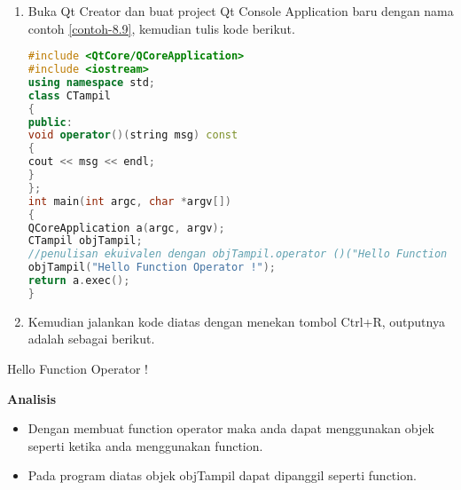\begin{enumerate}

\item
  Buka Qt Creator dan buat project Qt Console Application baru dengan
  nama contoh \ref{contoh-8.9}, kemudian tulis kode berikut.

\begin{lstlisting}[language=c++, caption=Menggunakan operator() untuk membuat function object., label=contoh-8.9]
#include <QtCore/QCoreApplication>
#include <iostream>
using namespace std;
class CTampil
{
public:
void operator()(string msg) const
{
cout << msg << endl;
}
};
int main(int argc, char *argv[])
{
QCoreApplication a(argc, argv);
CTampil objTampil;
//penulisan ekuivalen dengan objTampil.operator ()("Hello Function Operator !");
objTampil("Hello Function Operator !");
return a.exec();
}
\end{lstlisting}
\item
  Kemudian jalankan kode diatas dengan menekan tombol Ctrl+R, outputnya
  adalah sebagai berikut.
\end{enumerate}

\begin{lcverbatim}
Hello Function Operator !
\end{lcverbatim}

\textbf{Analisis}

\begin{itemize}

\item
  Dengan membuat function operator maka anda dapat menggunakan objek
  seperti ketika anda menggunakan function.
\item
  Pada program diatas objek objTampil dapat dipanggil seperti function.
\end{itemize}
